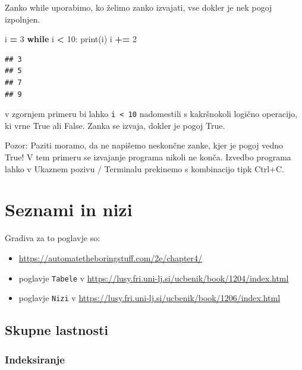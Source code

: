 \documentclass[
]{book}
\newenvironment{Shaded}{\begin{snugshade}}{\end{snugshade}}
\newcommand{\BuiltInTok}[1]{#1}
\newcommand{\ControlFlowTok}[1]{\textcolor[rgb]{0.13,0.29,0.53}{\textbf{#1}}}
\newcommand{\DecValTok}[1]{\textcolor[rgb]{0.00,0.00,0.81}{#1}}
\newcommand{\NormalTok}[1]{#1}
\newcommand{\OperatorTok}[1]{\textcolor[rgb]{0.81,0.36,0.00}{\textbf{#1}}}
\providecommand{\tightlist}{%
  \setlength{\itemsep}{0pt}\setlength{\parskip}{0pt}}
\begin{document}
Zanko while uporabimo, ko želimo zanko izvajati, vse dokler je nek pogoj izpolnjen.

\begin{Shaded}
\begin{Highlighting}[]
\NormalTok{i }\OperatorTok{=} \DecValTok{3}
\ControlFlowTok{while}\NormalTok{ i }\OperatorTok{\textless{}} \DecValTok{10}\NormalTok{:}
    \BuiltInTok{print}\NormalTok{(i)}
\NormalTok{    i }\OperatorTok{+=} \DecValTok{2}
\end{Highlighting}
\end{Shaded}

\begin{verbatim}
## 3
## 5
## 7
## 9
\end{verbatim}

v zgornjem primeru bi lahko \texttt{i\ \textless{}\ 10} nadomestili s kakršnokoli logično operacijo,
ki vrne True ali False. Zanka se izvaja, dokler je pogoj True.

Pozor: Paziti moramo, da ne napišemo neskončne zanke, kjer je pogoj vedno True!
V tem primeru se izvajanje programa nikoli ne konča. Izvedbo programa lahko v
Ukaznem pozivu / Terminalu prekinemo s kombinacijo tipk Ctrl+C.

\hypertarget{seznami-in-nizi}{%
\chapter{Seznami in nizi}\label{seznami-in-nizi}}

Gradiva za to poglavje so:

\begin{itemize}
\tightlist
\item
  \url{https://automatetheboringstuff.com/2e/chapter4/}
\item
  poglavje \texttt{Tabele} v \url{https://lusy.fri.uni-lj.si/ucbenik/book/1204/index.html}
\item
  poglavje \texttt{Nizi} v \url{https://lusy.fri.uni-lj.si/ucbenik/book/1206/index.html}
\end{itemize}

\hypertarget{skupne-lastnosti}{%
\section{Skupne lastnosti}\label{skupne-lastnosti}}

\hypertarget{indeksiranje}{%
\subsection{Indeksiranje}\label{indeksiranje}}
\end{document}
